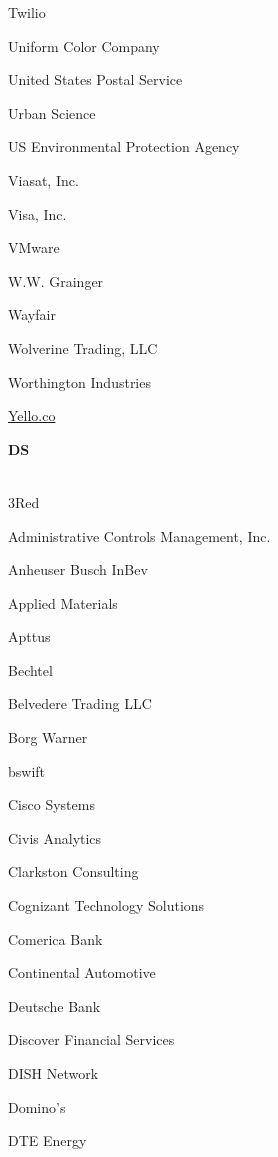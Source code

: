 \documentclass[twoside]{article}
\begin{document}
\begin{center}
\begin{multicols}{5}
\begin{FlushLeft}
\begin{compactitem}
\item Twilio
\item Uniform Color Company
\item United States Postal Service
\item Urban Science
\item US Environmental Protection Agency
\item Viasat, Inc.
\item Visa, Inc.
\item VMware
\item W.W. Grainger
\item Wayfair
\item Wolverine Trading, LLC
\item Worthington Industries
\item \url{Yello.co}
\end{compactitem}
        \end{FlushLeft}
        \vspace{1em}
        {\fontsize{14}{16}\selectfont \bf DS}\\
        \vspace{-1em}
        ~\hrulefill~
        \vspace{-.9em}
        \begin{FlushLeft}
        \begin{compactitem}
        \item 3Red
\item Administrative Controls Management, Inc.
\item Anheuser Busch InBev
\item Applied Materials
\item Apttus
\item Bechtel
\item Belvedere Trading LLC
\item Borg Warner
\item bswift
\item Cisco Systems
\item Civis Analytics
\item Clarkston Consulting
\item Cognizant Technology Solutions
\item Comerica Bank
\item Continental Automotive
\item Deutsche Bank
\item Discover Financial Services
\item DISH Network
\item Domino's
\item DTE Energy

\end{compactitem}
\end{FlushLeft}
\end{multicols}
\end{center}
\end{document}
